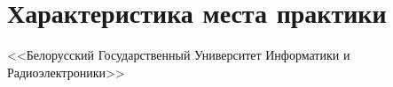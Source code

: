 \section{Характеристика места практики}
\label{sec:practice:itechart_characteristics}
\newcommand{\company}{\mbox{<<Техартгруп>>}}
\newcommand{\bsuir}{<<Белорусский Государственный Университет Информатики и Радиоэлектроники>>}

\bsuir




